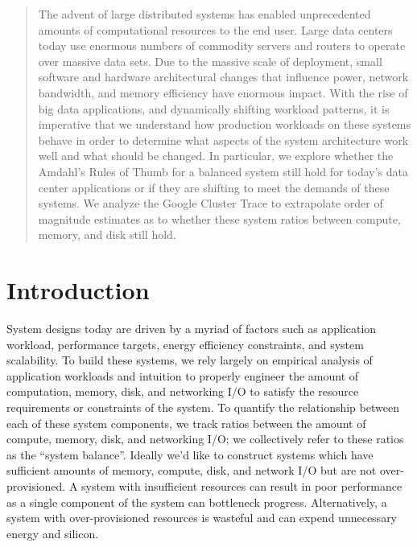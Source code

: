 \documentclass{sig-alternate}
\begin{document}
\maketitle
\begin{abstract}

The advent of large distributed systems has enabled unprecedented amounts of computational resources to the end user.
Large data centers today use enormous numbers of commodity servers and routers to operate over massive data sets.
Due to the massive scale of deployment, small software and hardware architectural changes that influence power, network bandwidth, and memory efficiency have enormous impact.
With the rise of big data applications, and dynamically shifting workload patterns, it is imperative that we understand how production workloads on these systems behave in order to determine what aspects of the system architecture work well and what should be changed.
In particular, we explore whether the Amdahl's Rules of Thumb for a balanced system still hold for today's data center applications or if they are shifting to meet the demands of these systems.
We analyze the Google Cluster Trace to extrapolate order of magnitude estimates as to whether these system ratios between compute, memory, and disk still hold.

\end{abstract}




\section{Introduction}

System designs today are driven by a myriad of factors such as application workload, performance targets, energy efficiency constraints, and system scalability.
To build these systems, we rely largely on empirical analysis of application workloads and intuition to properly engineer the amount of computation, memory, disk, and networking I/O to satisfy the resource requirements or constraints of the system.
To quantify the relationship between each of these system components, we track ratios between the amount of compute, memory, disk, and networking I/O; we collectively refer to these ratios as the ``system balance''.
Ideally we'd like to construct systems which have sufficient amounts of memory, compute, disk, and network I/O but are not over-provisioned.
A system with insufficient resources can result in poor performance as a single component of the system can bottleneck progress.
Alternatively, a system with over-provisioned resources is wasteful and can expend unnecessary energy and silicon.
\end{document}
